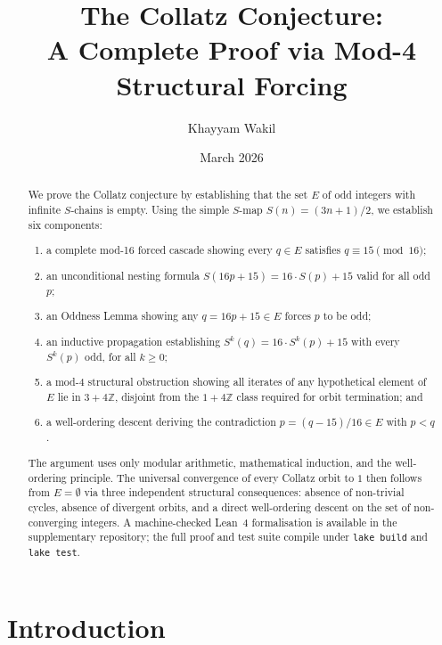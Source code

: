 \documentclass{amsart}
\title{The Collatz Conjecture:\\
       A Complete Proof via Mod-4 Structural Forcing}
\author{Khayyam Wakil}
\date{March 2026}
\theoremstyle{definition}
\theoremstyle{remark}
\newcommand{\Z}{\mathbb{Z}}
\begin{document}

\begin{abstract}
We prove the Collatz conjecture by establishing that the set $E$ of odd
integers with infinite $S$-chains is empty.
Using the simple $S$-map $S(n)=(3n+1)/2$, we establish six components:
\begin{enumerate}[label=(\arabic*),itemsep=0pt,topsep=2pt]
  \item a complete mod-16 forced cascade showing every $q\in E$ satisfies
        $q\equiv 15\pmod{16}$;
  \item an unconditional nesting formula $S(16p+15)=16\cdot S(p)+15$
        valid for all odd $p$;
  \item an Oddness Lemma showing any $q=16p+15\in E$ forces $p$ to be odd;
  \item an inductive propagation establishing $S^k(q)=16\cdot S^k(p)+15$
        with every $S^k(p)$ odd, for all $k\ge 0$;
  \item a mod-4 structural obstruction showing all iterates of any
        hypothetical element of $E$ lie in $3+4\Z$, disjoint from the
        $1+4\Z$ class required for orbit termination; and
  \item a well-ordering descent deriving the contradiction
        $p=(q-15)/16\in E$ with $p<q$.
\end{enumerate}
The argument uses only modular arithmetic, mathematical induction, and the
well-ordering principle.
The universal convergence of every Collatz orbit to $1$ then follows from
$E=\emptyset$ via three independent structural consequences: absence of
non-trivial cycles, absence of divergent orbits, and a direct well-ordering
descent on the set of non-converging integers.
A machine-checked Lean~4 formalisation is available in the supplementary
repository; the full proof and test suite compile under \texttt{lake build}
and \texttt{lake test}.
\end{abstract}

\maketitle

\section{Introduction}
\end{document}
